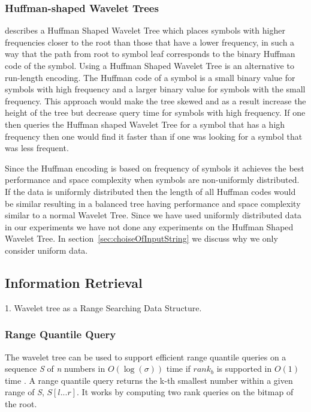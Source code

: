 \subsubsection{Huffman-shaped Wavelet Trees}
\citep[Section 2]{FMcountOnBWT} describes a Huffman Shaped Wavelet Tree which places symbols with higher frequencies closer to the root than those that have a lower frequency, in such a way that the path from root to symbol leaf corresponds to the binary Huffman code of the symbol. Using a Huffman Shaped Wavelet Tree is an alternative to run-length encoding.
The Huffman code of a symbol is a small binary value for symbols with high frequency and a larger binary value for symbols with the small frequency.
This approach would make the tree skewed and as a result increase the height of the tree but decrease query time for symbols with high frequency.
If one then queries the Huffman shaped Wavelet Tree for a symbol that has a high frequency then one would find it faster than if one was looking for a symbol that was less frequent.

Since the Huffman encoding is based on frequency of symbols it achieves the best performance and space complexity when symbols are non-uniformly distributed.
If the data is uniformly distributed then the length of all Huffman codes would be similar resulting in a balanced tree having performance and space complexity similar to a normal Wavelet Tree.
Since we have used uniformly distributed data in our experiments we have not done any experiments on the Huffman Shaped Wavelet Tree.
In section~\ref{sec:choiseOfInputString} we discuss why we only consider uniform data.


\subsection{Information Retrieval}
1. Wavelet tree as a Range Searching Data Structure.\\


\subsubsection{Range Quantile Query}
The wavelet tree can be used to support efficient range quantile queries on a sequence \textit{S} of \textit{n} numbers in $O(\log(\sigma))$ time if $rank_b$ is supported in $O(1)$ time \citep[Section 3]{RangeQuantileQueryWT}. 
A range quantile query returns the k-th smallest number within a given range of \textit{S}, $S[l ... r]$.
It works by computing two rank queries on the bitmap of the root. 

